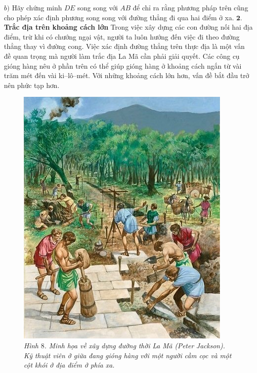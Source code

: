 \begin{multicols}{2}
\begin{figure}[H]
		\vspace*{-10pt}
	\end{figure}
	$b)$ Hãy chứng minh $D E$ song song với $AB$ để chỉ ra rằng phương pháp trên cũng cho phép xác định phương song song với đường thẳng đi qua hai điểm ở xa.
	\vskip 0.1cm
	$\pmb{2.}$ \textbf{\color{toanhocdoisong}Trắc địa trên khoảng cách lớn}
	\vskip 0.1cm
	Trong việc xây dựng các con đường nối hai địa điểm, trừ khi có chướng ngại vật, người ta luôn hướng đến việc đi theo đường thẳng thay vì đường cong. Việc xác định đường thẳng trên thực địa là một vấn đề quan trọng mà người làm trắc địa La Mã cần phải giải quyết. Các công cụ gióng hàng nêu ở phần trên có thể giúp gióng hàng ở khoảng cách ngắn từ vài trăm mét đến vài ki--lô--mét. Với những khoảng cách lớn hơn, vấn đề bắt đầu trở nên phức tạp hơn.
	\begin{figure}[H]
		\vspace*{-5pt}
		\centering
		\captionsetup{labelformat= empty, justification=centering}
		\includegraphics[height= 0.8\linewidth]{8}
		\caption{\small\textit{\color{toanhocdoisong}Hình $8$. Minh họa về xây dựng đường thời La Mã (Peter Jackson). Kỹ thuật viên ở giữa đang gióng hàng với một người cầm cọc và một cột khói ở địa điểm ở phía xa.}}

\end{figure}
\end{multicols}
